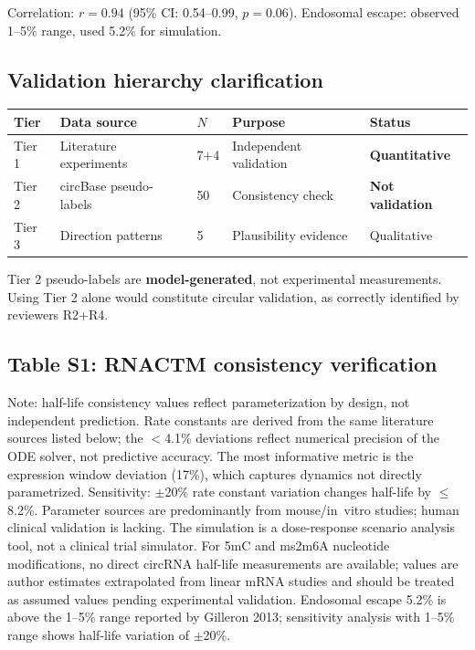 Correlation: $r{=}0.94$ (95\% CI: 0.54--0.99, $p{=}0.06$). Endosomal escape: observed 1--5\% range, used 5.2\% for simulation.

\subsection*{Validation hierarchy clarification}

\begin{tabular}{lllll}
\toprule
\textbf{Tier} & \textbf{Data source} & \textbf{$N$} & \textbf{Purpose} & \textbf{Status} \\
\midrule
Tier 1 & Literature experiments & 7+4 & Independent validation & \textbf{Quantitative} \\
Tier 2 & circBase pseudo-labels & 50 & Consistency check & \textbf{Not validation} \\
Tier 3 & Direction patterns & 5 & Plausibility evidence & Qualitative \\
\bottomrule
\end{tabular}

Tier 2 pseudo-labels are \textbf{model-generated}, not experimental measurements. Using Tier 2 alone would constitute circular validation, as correctly identified by reviewers R2+R4.

\subsection*{Table S1: RNACTM consistency verification}

\small Note: half-life consistency values reflect parameterization by design, not independent prediction. Rate constants are derived from the same literature sources listed below; the $<$4.1\% deviations reflect numerical precision of the ODE solver, not predictive accuracy. The most informative metric is the expression window deviation (17\%), which captures dynamics not directly parametrized. Sensitivity: $\pm$20\% rate constant variation changes half-life by $\leq$8.2\%. Parameter sources are predominantly from mouse/in~vitro studies; human clinical validation is lacking. The simulation is a dose-response scenario analysis tool, not a clinical trial simulator. For 5mC and ms2m6A nucleotide modifications, no direct circRNA half-life measurements are available; values are author estimates extrapolated from linear mRNA studies and should be treated as assumed values pending experimental validation. Endosomal escape 5.2\% is above the 1--5\% range reported by Gilleron 2013; sensitivity analysis with 1--5\% range shows half-life variation of $\pm$20\%.


